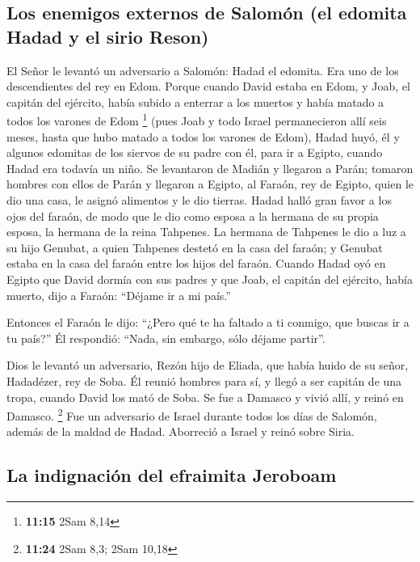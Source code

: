 \hypertarget{los-enemigos-externos-de-salomuxf3n-el-edomita-hadad-y-el-sirio-reson}{%
\subsection{Los enemigos externos de Salomón (el edomita Hadad y el
sirio
Reson)}\label{los-enemigos-externos-de-salomuxf3n-el-edomita-hadad-y-el-sirio-reson}}

 El Señor le levantó un adversario a Salomón: Hadad el
edomita. Era uno de los descendientes del rey en Edom. 
Porque cuando David estaba en Edom, y Joab, el capitán del ejército,
había subido a enterrar a los muertos y había matado a todos los varones
de Edom \footnote{\textbf{11:15} 2Sam 8,14}  (pues Joab y
todo Israel permanecieron allí seis meses, hasta que hubo matado a todos
los varones de Edom),  Hadad huyó, él y algunos edomitas
de los siervos de su padre con él, para ir a Egipto, cuando Hadad era
todavía un niño.  Se levantaron de Madián y llegaron a
Parán; tomaron hombres con ellos de Parán y llegaron a Egipto, al
Faraón, rey de Egipto, quien le dio una casa, le asignó alimentos y le
dio tierras.  Hadad halló gran favor a los ojos del
faraón, de modo que le dio como esposa a la hermana de su propia esposa,
la hermana de la reina Tahpenes.  La hermana de Tahpenes
le dio a luz a su hijo Genubat, a quien Tahpenes destetó en la casa del
faraón; y Genubat estaba en la casa del faraón entre los hijos del
faraón.  Cuando Hadad oyó en Egipto que David dormía con
sus padres y que Joab, el capitán del ejército, había muerto, dijo a
Faraón: ``Déjame ir a mi país.''

 Entonces el Faraón le dijo: ``¿Pero qué te ha faltado a
ti conmigo, que buscas ir a tu país?'' Él respondió: ``Nada, sin
embargo, sólo déjame partir''.

 Dios le levantó un adversario, Rezón hijo de Eliada, que
había huido de su señor, Hadadézer, rey de Soba.  Él
reunió hombres para sí, y llegó a ser capitán de una tropa, cuando David
los mató de Soba. Se fue a Damasco y vivió allí, y reinó en Damasco.
\footnote{\textbf{11:24} 2Sam 8,3; 2Sam 10,18}  Fue un
adversario de Israel durante todos los días de Salomón, además de la
maldad de Hadad. Aborreció a Israel y reinó sobre Siria.

\hypertarget{la-indignaciuxf3n-del-efraimita-jeroboam}{%
\subsection{La indignación del efraimita
Jeroboam}\label{la-indignaciuxf3n-del-efraimita-jeroboam}}

